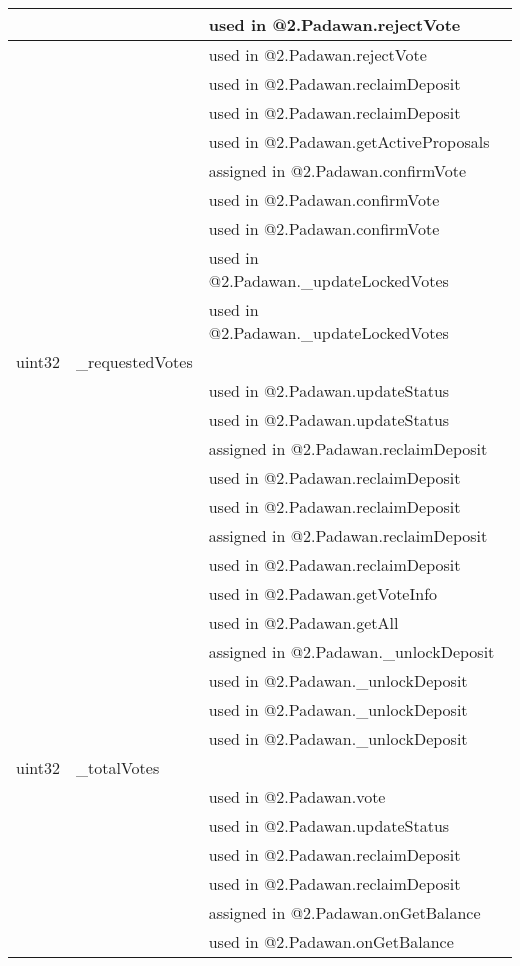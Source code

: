 \begin{tabular}{|l|l|p{5cm}|}
 & & used in @2.Padawan.rejectVote\\\hline
 & & used in @2.Padawan.rejectVote\\\hline
 & & used in @2.Padawan.reclaimDeposit\\\hline
 & & used in @2.Padawan.reclaimDeposit\\\hline
 & & used in @2.Padawan.getActiveProposals\\\hline
 & & assigned in @2.Padawan.confirmVote\\\hline
 & & used in @2.Padawan.confirmVote\\\hline
 & & used in @2.Padawan.confirmVote\\\hline
 & & used in @2.Padawan.\_{}updateLockedVotes\\\hline
 & & used in @2.Padawan.\_{}updateLockedVotes\\\hline
uint32 & \_{}requestedVotes &  \\\hline
 & & used in @2.Padawan.updateStatus\\\hline
 & & used in @2.Padawan.updateStatus\\\hline
 & & assigned in @2.Padawan.reclaimDeposit\\\hline
 & & used in @2.Padawan.reclaimDeposit\\\hline
 & & used in @2.Padawan.reclaimDeposit\\\hline
 & & assigned in @2.Padawan.reclaimDeposit\\\hline
 & & used in @2.Padawan.reclaimDeposit\\\hline
 & & used in @2.Padawan.getVoteInfo\\\hline
 & & used in @2.Padawan.getAll\\\hline
 & & assigned in @2.Padawan.\_{}unlockDeposit\\\hline
 & & used in @2.Padawan.\_{}unlockDeposit\\\hline
 & & used in @2.Padawan.\_{}unlockDeposit\\\hline
 & & used in @2.Padawan.\_{}unlockDeposit\\\hline
uint32 & \_{}totalVotes &  \\\hline
 & & used in @2.Padawan.vote\\\hline
 & & used in @2.Padawan.updateStatus\\\hline
 & & used in @2.Padawan.reclaimDeposit\\\hline
 & & used in @2.Padawan.reclaimDeposit\\\hline
 & & assigned in @2.Padawan.onGetBalance\\\hline
 & & used in @2.Padawan.onGetBalance\\\hline

\end{tabular}
